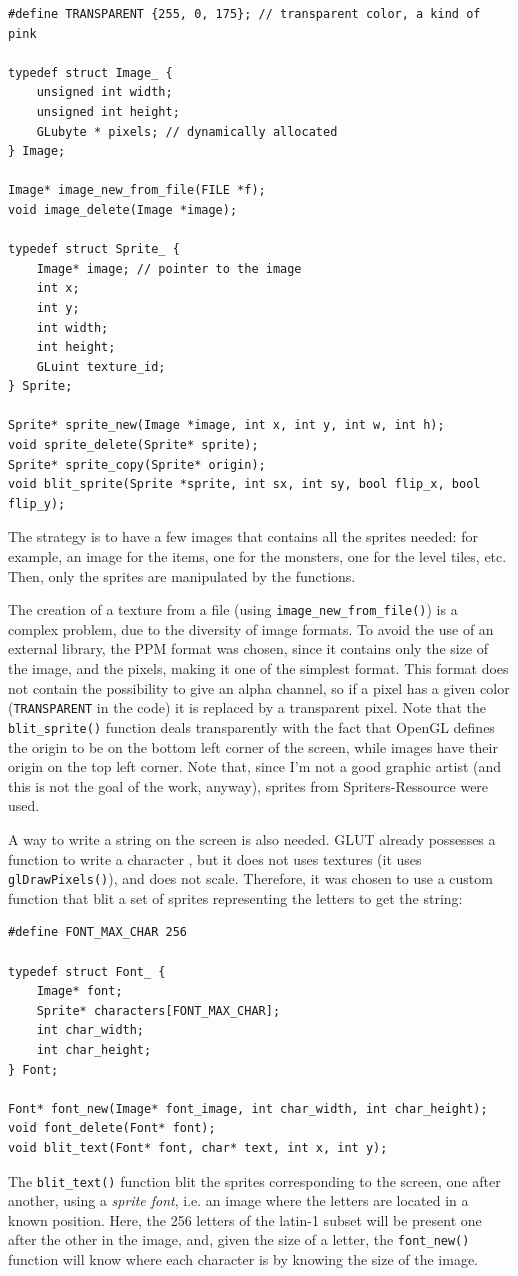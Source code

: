 \documentclass[12pt,a4paper]{article}
\newcommand{\cc}[1]{\texttt{#1}}
\begin{document}
\begin{verbatim}
#define TRANSPARENT {255, 0, 175}; // transparent color, a kind of pink

typedef struct Image_ {
	unsigned int width;
	unsigned int height;
	GLubyte * pixels; // dynamically allocated
} Image;

Image* image_new_from_file(FILE *f);
void image_delete(Image *image);

typedef struct Sprite_ {
	Image* image; // pointer to the image
	int x;
	int y;
	int width;
	int height;
	GLuint texture_id;
} Sprite;

Sprite* sprite_new(Image *image, int x, int y, int w, int h);
void sprite_delete(Sprite* sprite);
Sprite* sprite_copy(Sprite* origin);
void blit_sprite(Sprite *sprite, int sx, int sy, bool flip_x, bool flip_y);
\end{verbatim}

The strategy is to have a few images that contains all the sprites needed: for example, an image for the items, one for the monsters, one for the level tiles, etc. Then, only the sprites are manipulated by the functions.

The creation of a texture from a file (using \cc{image_new_from_file()}) is a complex problem, due to the diversity of image formats. To avoid the use of an external library, the PPM format \cite{ppmformat} was chosen, since it contains only the size of the image, and the pixels, making it one of the simplest format. This format does not contain the possibility to give an alpha channel, so if a pixel has a given color (\cc{TRANSPARENT} in the code) it is replaced by a transparent pixel. Note that the \cc{blit_sprite()} function deals transparently with the fact that OpenGL defines the origin to be on the bottom left corner of the screen, while images have their origin on the top left corner. Note that, since I'm not a good graphic artist (and this is not the goal of the work, anyway), sprites from Spriters-Ressource \cite{spriters} were used.

A way to write a string on the screen is also needed. GLUT already possesses a function to write a character \cite{glutrefchar}, but it does not uses textures (it uses \cc{glDrawPixels()}), and does not scale. Therefore, it was chosen to use a custom function that blit a set of sprites representing the letters to get the string:
\begin{verbatim}
#define FONT_MAX_CHAR 256

typedef struct Font_ {
	Image* font;
	Sprite* characters[FONT_MAX_CHAR];
    int char_width;
    int char_height;
} Font;

Font* font_new(Image* font_image, int char_width, int char_height);
void font_delete(Font* font);
void blit_text(Font* font, char* text, int x, int y);
\end{verbatim}
The \cc{blit_text()} function blit the sprites corresponding to the screen, one after another, using a \textit{sprite font}, i.e. an image where the letters are located in a known position. Here, the 256 letters of the latin-1 subset will be present one after the other in the image, and, given the size of a letter, the \cc{font_new()} function will know where each character is by knowing the size of the image.
\end{document}
